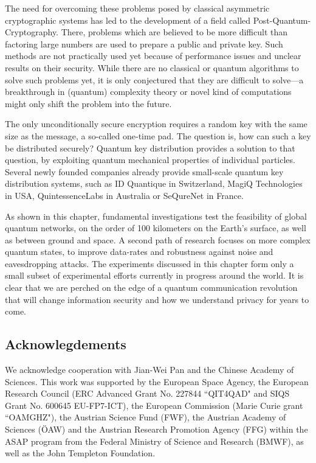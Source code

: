 \documentclass{article}
\begin{document}
The need for overcoming these problems posed by classical asymmetric cryptographic systems has led to the development of a field called Post-Quantum-Cryptography. There, problems which are believed to be more difficult than factoring large numbers are used to prepare a public and private key. Such methods are not practically used yet because of performance issues and unclear results on their security. While there are no classical or quantum algorithms to solve such problems yet, it is only conjectured that they are difficult to solve---a breakthrough in (quantum) complexity theory or novel kind of computations might only shift the problem into the future.

The only unconditionally secure encryption requires a random key with the same size as the message, a so-called one-time pad. The question is, how can such a key be distributed securely? Quantum key distribution provides a solution to that question, by exploiting quantum mechanical properties of individual particles. Several newly founded companies already provide small-scale quantum key distribution systems, such as ID Quantique in Switzerland, MagiQ Technologies in USA, QuintessenceLabs in Australia or SeQureNet in France.

As shown in this chapter, fundamental investigations test the feasibility of global quantum networks, on the order of 100 kilometers on the Earth's surface, as well as between ground and space. A second path of research focuses on more complex quantum states, to improve data-rates and robustness against noise and eavesdropping attacks. The experiments discussed in this chapter form only a small subset of experimental efforts currently in progress around the world. It is clear that we are perched on the edge of a quantum communication revolution that will change information security and how we understand privacy for years to come. 

\subsection*{Acknowlegdements}
We acknowledge cooperation with Jian-Wei Pan and the Chinese Academy of Sciences. This work was supported by the European Space Agency, the European Research Council (ERC Advanced Grant No. 227844 ``QIT4QAD" and SIQS Grant No. 600645 EU-FP7-ICT), the European Commission (Marie Curie grant ``OAMGHZ"), the Austrian Science Fund (FWF), the Austrian Academy of Sciences (\"OAW) and the Austrian Research Promotion Agency (FFG) within the ASAP program from the Federal Ministry of Science and Research (BMWF), as well as the John Templeton Foundation. 



\end{document}
